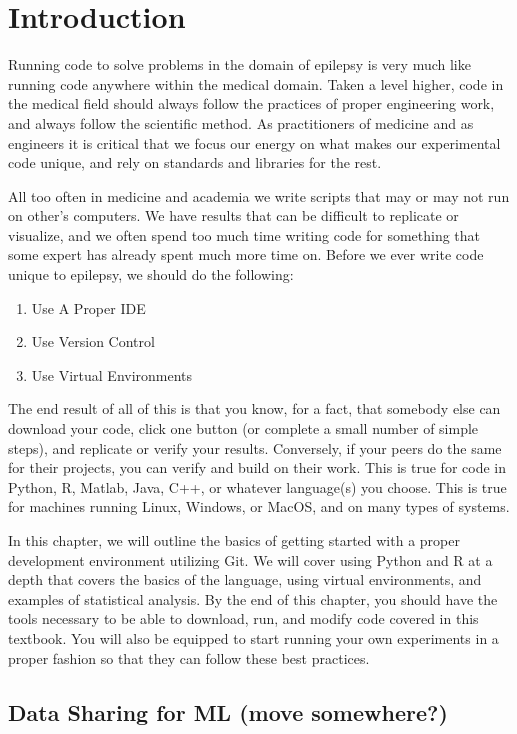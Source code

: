 \section{Introduction}
Running code to solve problems in the domain of epilepsy is very much like running code anywhere within the medical domain.
Taken a level higher, code in the medical field should always follow the practices of proper engineering work, and always follow the scientific method.
As practitioners of medicine and as engineers it is critical that we focus our energy on what makes our experimental code unique, and rely on standards and libraries for the rest.

All too often in medicine and academia we write scripts that may or may not run on other's computers.
We have results that can be difficult to replicate or visualize, and we often spend too much time writing code for something that some expert has already spent much more time on.
Before we ever write code unique to epilepsy, we should do the following:
\begin{enumerate}
    \item Use A Proper IDE
    \item Use Version Control
    \item Use Virtual Environments
\end{enumerate}

The end result of all of this is that you know, for a fact, that somebody else can download your code, click one button (or complete a small number of simple steps), and replicate or verify your results.
Conversely, if your peers do the same for their projects, you can verify and build on their work.
This is true for code in Python, R, Matlab, Java, C++, or whatever language(s) you choose.
This is true for machines running Linux, Windows, or MacOS, and on many types of systems.

In this chapter, we will outline the basics of getting started with a proper development environment utilizing Git.
We will cover using Python and R at a depth that covers the basics of the language, using virtual environments, and examples of statistical analysis.
By the end of this chapter, you should have the tools necessary to be able to download, run, and modify code covered in this textbook.
You will also be equipped to start running your own experiments in a proper fashion so that they can follow these best practices.

\subsection{Data Sharing for ML (move somewhere?)}